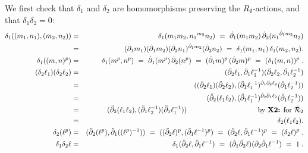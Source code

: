 \begin{pf}
We first check that $\delta_1$ and $\delta_2$ are homomorphisms 
preserving the $R_{\emptyset}$-actions,
and that $\delta_1\delta_2 = 0$\;:
\begin{eqnarray*}
\delta_1((m_1,n_1),(m_2,n_2))
& = & \delta_1(m_1m_2, {n_1}^{m_2}n_2)
      ~=~ \dbdyo(m_1m_2)\,\dbdyt({n_1}^{\dbdyo m_2} n_2) \\
& = & (\dbdyo m_1)(\dbdyo m_2)(\dbdyt n_1)^{\dbdyo m_2}(\dbdyt n_2)
      ~=~ \delta_1(m_1,n_1)\,\delta_1(m_2,n_2). \\
\delta_1((m,n)^p)
& = & \delta_1(m^p,n^p)
      ~=~ \dbdyo(m^p)\,\dbdyt(n^p)
      ~=~ (\dbdyo m)^p\,(\dbdyt m)^p
      ~=~ (\delta_1(m,n))^p\;. \\
(\delta_2 \ell_1)(\delta_2 \ell_2)
& = & (\ddbdyt\ell_1,\ddbdyo\ell_1^{-1})(\ddbdyt\ell_2,\ddbdyo\ell_2^{-1})\\
& = & ((\ddbdyt \ell_1)(\ddbdyt \ell_2),
            (\ddbdyo \ell_1^{-1})^{\dbdyo\ddbdyt\ell_2}(\ddbdyo \ell_2^{-1}))\\
& = & (\ddbdyt(\ell_1\ell_2),
            (\ddbdyo \ell_1^{-1})^{\dbdyt\ddbdyo\ell_2}(\ddbdyo \ell_2^{-1}))\\
& = & (\ddbdyt(\ell_1\ell_2),(\ddbdyo \ell_2^{-1})(\ddbdyo \ell_1^{-1}))
      \hspace{35mm} \mbox{by {\bf X2:} for}~ \dcalRt\\
& = & \delta_2(\ell_1\ell_2).\\
\delta_2(\ell^p)
& = & (\ddbdyt(\ell^p), \ddbdyo((\ell^p)^{-1}))
      ~=~ ((\ddbdyt \ell)^p, (\ddbdyo \ell^{-1})^p)
      ~=~ (\ddbdyt \ell, \ddbdyo \ell^{-1})^p
      ~=~ (\delta_2 \ell)^p\;. \\
\delta_1\delta_2\ell
& = & \delta_1(\ddbdyt\ell, \ddbdyo\ell^{-1})
      ~=~ (\dbdyo\ddbdyt\ell)(\dbdyt\ddbdyo\ell^{-1})
      ~=~ 1\;.
\end{eqnarray*}


\end{pf}
